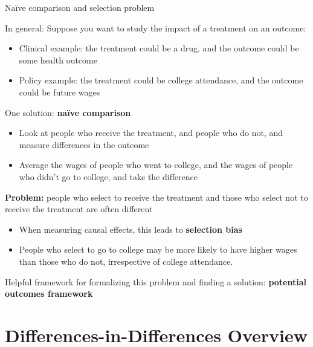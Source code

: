 \documentclass[compress, 8pt]{beamer}
\begin{document}
\begin{frame}{Na{\"i}ve comparison and selection problem}

In general: Suppose you want to study the impact of a treatment on an outcome:
\begin{itemize}
\item  Clinical example: the treatment could be a drug, and the outcome could be some health outcome
\item Policy example: the treatment could be college attendance,  and the outcome could be future wages
\end{itemize}

\vspace{2ex}
One solution: \textbf{na{\"i}ve comparison}
\begin{itemize}
\item  
 Look at people who receive the treatment, and people who do not, and measure differences in the outcome
\item  Average the wages of people who went to college,  and the wages of people who didn't go to college,  and take the difference
\end{itemize}

\vspace{2ex} \textbf{Problem:} people who select to receive the treatment and those who select not to receive the treatment are often different
\begin{itemize}
\item When measuring causal effects,  this leads to \textbf{selection bias}
\item People who select to go to college may be more likely to have higher wages than those who do not,  irrespective of college attendance. 
\end{itemize}

\vspace{2ex}
Helpful framework for formalizing this problem and finding a solution: \textbf{potential outcomes framework}

\end{frame}



\section[DiD]{Differences-in-Differences Overview}
\miniframesoff
\begin{frame}
    \tableofcontents[currentsection]
\end{frame}
\miniframeson
\end{document}
